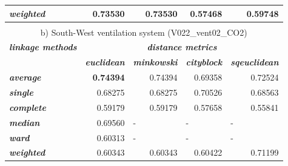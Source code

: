 \begin{table}[htbp]
\begin{tabular}{|l|r|r|r|r|}
    \hline
    \rowcolor[rgb]{ .851,  .851,  .851} \textit{\textbf{weighted}} & \cellcolor[rgb]{ 1,  1,  1} 0.73530 & \cellcolor[rgb]{ 1,  1,  1} 0.73530 & \cellcolor[rgb]{ 1,  1,  1} 0.57468 & \cellcolor[rgb]{ 1,  1,  1} 0.59748 \bigstrut\\
    \hline
    \multicolumn{1}{r}{} & \multicolumn{1}{r}{} & \multicolumn{1}{r}{} & \multicolumn{1}{r}{} & \multicolumn{1}{r}{} \bigstrut\\
    \hline
    \multicolumn{5}{|c|}{b) South-West ventilation system (V022\_vent02\_CO2)} \bigstrut\\
    \hline
    \rowcolor[rgb]{ .851,  .851,  .851} \textit{\textbf{linkage methods}} & \multicolumn{4}{c|}{\cellcolor[rgb]{ .855,  .933,  .953} \textit{\textbf{distance metrics}}} \bigstrut\\
\cline{2-5}    \rowcolor[rgb]{ .851,  .851,  .851}      & \multicolumn{1}{c|}{\cellcolor[rgb]{ .855,  .933,  .953} \textit{\textbf{euclidean}}} & \multicolumn{1}{c|}{\cellcolor[rgb]{ .855,  .933,  .953} \textit{\textbf{minkowski}}} & \multicolumn{1}{c|}{\cellcolor[rgb]{ .855,  .933,  .953} \textit{\textbf{cityblock}}} & \multicolumn{1}{c|}{\cellcolor[rgb]{ .855,  .933,  .953} \textit{\textbf{sqeuclidean}}} \bigstrut\\
    \hline
    \rowcolor[rgb]{ .851,  .851,  .851} \textit{\textbf{average}} & \cellcolor[rgb]{ .573,  .816,  .314} \textbf{0.74394} & \cellcolor[rgb]{ 1,  1,  1} 0.74394 & \cellcolor[rgb]{ 1,  1,  1} 0.69358 & \cellcolor[rgb]{ 1,  1,  1} 0.72524 \bigstrut\\
    \hline
    \rowcolor[rgb]{ .851,  .851,  .851} \textit{\textbf{single}} & \cellcolor[rgb]{ 1,  1,  1} 0.68275 & \cellcolor[rgb]{ 1,  1,  1} 0.68275 & \cellcolor[rgb]{ 1,  1,  1} 0.70526 & \cellcolor[rgb]{ 1,  1,  1} 0.68563 \bigstrut\\
    \hline
    \rowcolor[rgb]{ .851,  .851,  .851} \textit{\textbf{complete}} & \cellcolor[rgb]{ 1,  1,  1} 0.59179 & \cellcolor[rgb]{ 1,  1,  1} 0.59179 & \cellcolor[rgb]{ 1,  1,  1} 0.57658 & \cellcolor[rgb]{ 1,  1,  1} 0.55841 \bigstrut\\
    \hline
    \rowcolor[rgb]{ .851,  .851,  .851} \textit{\textbf{median}} & \cellcolor[rgb]{ 1,  1,  1} 0.69560 & \multicolumn{1}{l|}{\cellcolor[rgb]{ 1,  1,  1} -} & \multicolumn{1}{l|}{\cellcolor[rgb]{ 1,  1,  1} -} & \multicolumn{1}{l|}{\cellcolor[rgb]{ 1,  1,  1} -} \bigstrut\\
    \hline
    \rowcolor[rgb]{ .851,  .851,  .851} \textit{\textbf{ward}} & \cellcolor[rgb]{ 1,  1,  1} 0.60313 & \multicolumn{1}{l|}{\cellcolor[rgb]{ 1,  1,  1} -} & \multicolumn{1}{l|}{\cellcolor[rgb]{ 1,  1,  1} -} & \multicolumn{1}{l|}{\cellcolor[rgb]{ 1,  1,  1} -} \bigstrut\\
    \hline
    \rowcolor[rgb]{ .851,  .851,  .851} \textit{\textbf{weighted}} & \cellcolor[rgb]{ 1,  1,  1} 0.60343 & \cellcolor[rgb]{ 1,  1,  1} 0.60343 & \cellcolor[rgb]{ 1,  1,  1} 0.60422 & \cellcolor[rgb]{ 1,  1,  1} 0.71199 \bigstrut\\
    \hline
    \end{tabular}%
  \label{tab:cophenetic_correlation}%
\end{table}%


